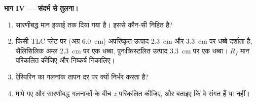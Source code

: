 \begin{problem}
\noindent\textbf{भाग IV --- संदर्भ से तुलना।}
\begin{enumerate}[resume]
  \item सारणीबद्ध मान इकाई तक दिया गया है। इससे कौन-सी  निहित है?
  \item किसी TLC प्लेट पर (अग्र \qty{6.0}{cm}) अपरिष्कृत उत्पाद
        \qty{2.3}{cm} और \qty{3.3}{cm} पर धब्बे दर्शाता है, सैलिसिलिक अम्ल
        \qty{2.3}{cm} पर एक धब्बा, पुनःक्रिस्टलित उत्पाद
        \qty{3.3}{cm} पर एक धब्बा। $R_f$ मान परिकलित कीजिए और निष्कर्ष निकालिए।
  \item ऐस्पिरिन का गलनांक तापन दर पर क्यों निर्भर करता है?
  \item मापे गए और
        सारणीबद्ध गलनांकों के बीच  $z$ परिकलित कीजिए, और बताइए कि वे संगत हैं या नहीं।
\end{enumerate}
\end{problem}
